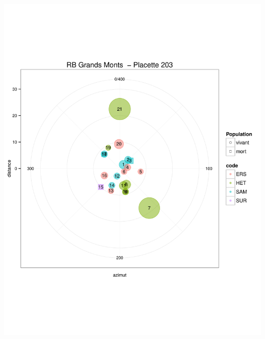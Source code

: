 \documentclass[a4paper]{book}\usepackage[]{graphicx}\usepackage[]{color}
\makeatletter
\def\maxwidth{ %
  \ifdim\Gin@nat@width>\linewidth
    \linewidth
  \else
    \Gin@nat@width
  \fi
}
\newenvironment{knitrout}{}{} %
\makeatother
\begin{document}
\begin{knitrout}
{\centering \includegraphics[width=\maxwidth]{Figures/PlanArbres-17} 

}





\end{knitrout}
\end{document}

